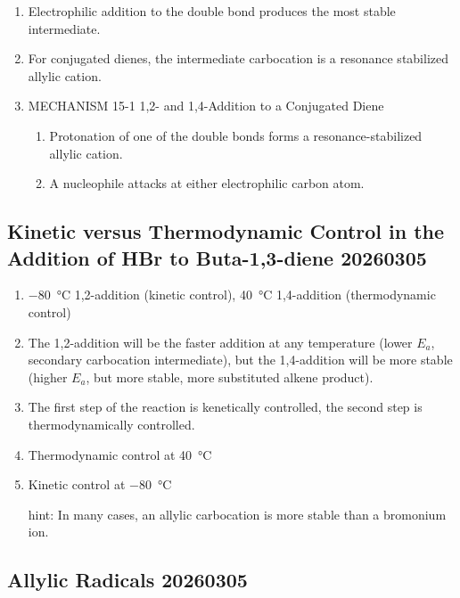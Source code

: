 \begin{enumerate}
    \item Electrophilic addition to the double bond produces the most stable intermediate.
    \item For conjugated dienes, the intermediate carbocation is a resonance stabilized allylic cation.
    \item MECHANISM 15-1 1,2- and 1,4-Addition to a Conjugated Diene %
    \begin{enumerate}
        \item Protonation of one of the double bonds forms a resonance-stabilized allylic cation.
        \item A nucleophile attacks at either electrophilic carbon atom.
    \end{enumerate}


\end{enumerate}

\subsection{Kinetic versus Thermodynamic Control in the Addition of HBr to Buta-1,3-diene 20260305}

\begin{enumerate}
    \item \qty{-80}{\degreeCelsius} 1,2-addition (kinetic control), \qty{40}{\degreeCelsius} 1,4-addition (thermodynamic control)
    \item The 1,2-addition will be the faster addition at any temperature (lower $E_a$, secondary carbocation intermediate), but the 1,4-addition will be more stable (higher $E_a$, but more stable, more substituted alkene product).
    \item The first step of the reaction is kenetically controlled, the second step is thermodynamically controlled.
    \item Thermodynamic control at \qty{40}{\degreeCelsius}
    \item Kinetic control at \qty{-80}{\degreeCelsius}
    \begin{example}%
        hint: In many cases, an allylic carbocation is more stable than a bromonium ion.
    \end{example}

\end{enumerate}

\subsection{Allylic Radicals 20260305}

